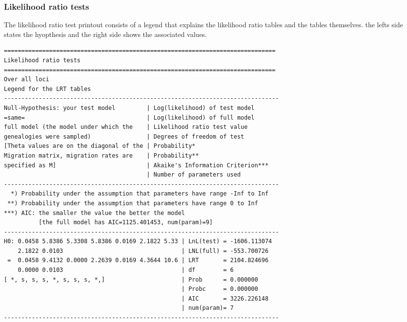 \subsubsection{Likelihood ratio tests}
The likelihood ratio test printout consists of a legend that explains the likelihood ratio tables and the tables themselves. the lefts side states the hyopthesis and the right side shows the associated values.
\begin{center}
\begin{boxedminipage}{6in}
\begin{small}
\begin{tt}
\begin{verbatim}
==============================================================================
Likelihood ratio tests
==============================================================================
Over all loci
Legend for the LRT tables
-------------------------------------------------------------------------------
Null-Hypothesis: your test model         | Log(likelihood) of test model
=same=                                   | Log(likelihood) of full model
full model (the model under which the    | Likelihood ratio test value
genealogies were sampled)                | Degrees of freedom of test
[Theta values are on the diagonal of the | Probability*
Migration matrix, migration rates are    | Probability**
specified as M]                          | Akaike's Information Criterion***
                                         | Number of parameters used
-------------------------------------------------------------------------------
  *) Probability under the assumption that parameters have range -Inf to Inf
 **) Probability under the assumption that parameters have range 0 to Inf
***) AIC: the smaller the value the better the model
          [the full model has AIC=1125.401453, num(param)=9]
-------------------------------------------------------------------------------
H0: 0.0458 5.8386 5.3308 5.8386 0.0169 2.1822 5.33 | LnL(test) = -1606.113074
    2.1822 0.0103                                  | LNL(full) = -553.700726
 =  0.0458 9.4132 0.0000 2.2639 0.0169 4.3644 10.6 | LRT       = 2104.824696
    0.0000 0.0103                                  | df        = 6
[ *, s, s, s, *, s, s, s, *,]                      | Prob      = 0.000000
                                                   | Probc     = 0.000000
                                                   | AIC       = 3226.226148
                                                   | num(param)= 7
-------------------------------------------------------------------------------
\end{verbatim}
\end{tt}
\end{small}
\end{boxedminipage}
\end{center}
\newpage
